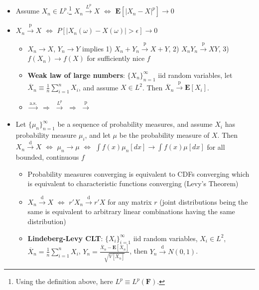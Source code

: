 \documentclass[12pt,english]{article}
\begin{document}
\begin{itemize}
\begin{itemize}
		\item Assume $X_{n} \in L^{p}$.\footnote{Using the definition above, here $L^{p} \equiv L^{p}(\mathbf{F})$.} $X_{n} \overset{L^{p}}{\to} X$ $\Leftrightarrow$ $\mathbf{E}[|X_{n} - X|^{p}] \to 0$
		\item $X_{n} \overset{\text{p}}{\to} X$ $\Leftrightarrow$ $P[|X_{n}(\omega) - X(\omega)| > \epsilon] \to 0$
		\begin{itemize}
			\item $X_{n} \to X$, $Y_{n} \to Y$ implies 1) $X_{n} + Y_{n} \overset{\text{p}}{\to} X + Y$, 2) $X_{n} Y_{n} \overset{\text{p}}{\to} X Y$, 3) $f(X_{n}) \to f(X)$ for sufficiently nice $f$
			\item \textbf{Weak law of large numbers}: $\{ X_{n} \}_{n=1}^{\infty}$ iid random variables, let $\overline{X}_{n} \equiv \frac{1}{n} \sum_{i=1}^{n} X_{i}$, and assume $X \in L^{2}$. Then $\overline{X}_{n} \overset{\text{p}}{\to} \mathbf{E}[X_{i}]$.
			\item $\overset{\text{a.s.}}{\to}$ $\Rightarrow$ $\overset{L^{p}}{\to}$ $\Rightarrow$ $\overset{\text{p}}{\to}$
		\end{itemize}
		\item Let $\{ \mu_{n} \}_{n=1}^{\infty}$ be a sequence of probability measures, and assume $X_{i}$ has probability measure $\mu_{i}$, and let $\mu$ be the probability measure of $X$. Then $X_{n} \overset{\text{d}}{\to} X$ $\Leftrightarrow$ $\mu_{n} \to \mu$ $\Leftrightarrow$ $\int f(x) \mu_{n}[dx] \to \int f(x) \mu[dx]$ for all bounded, continuous $f$
		\begin{itemize}
			\item Probability measures converging is equivalent to CDFs converging which is equivalent to characteristic functions converging (Levy's Theorem)
			\item $X_{n} \overset{\text{d}}{\to} X$ $\Leftrightarrow$ $r'X_{n} \overset{\text{d}}{\to} r'X$ for any matrix $r$ (joint distributions being the same is equivalent to arbitrary linear combinations having the same distribution)
			\item \textbf{Lindeberg-Levy CLT}: $\{ X_{i} \}_{i = 1}^{\infty}$ iid random variables, $X_{i} \in L^{2}$, $\overline{X}_{n} = \frac{1}{n} \sum_{i = 1}^{n} X_{i}$, $Y_{n} = \frac{\overline{X}_{n} - \mathbf{E}[\overline{X}_{n}]}{\sqrt{V[\overline{X}_{n}]}}$, then $Y_{n} \overset{\text{d}}{\to} N(0, 1)$.
		\end{itemize}
	\end{itemize}
\end{itemize}
\end{document}

